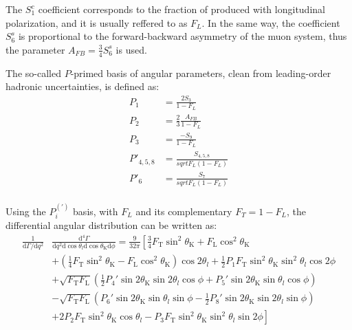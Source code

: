 The $S_1^c$ coefficient corresponds to the fraction of \Ks produced with longitudinal polarization, and it is usually reffered to as $F_L$.
In the same way, the coefficient $S_6^s$ is proportional to the forward-backward asymmetry of the muon system, thus the parameter $A_{FB}=\frac{3}{4}S_6^s$ is used.

The so-called $P$-primed basis of angular parameters, clean from leading-order hadronic uncertainties, is defined as:
\begin{equation}\label{eq:defPPrime}
  \begin{split}
    P_1 &= \frac{2S_3}{1-F_L}\\
    P_2 &= \frac{2}{3}\frac{A_{FB}}{1-F_L}\\
    P_3 &= \frac{-S_9}{1-F_L}\\
    P'_{4,5,8} &= \frac{S_{4,5,8}}{sqrt{F_L(1-F_L)}}\\
    P'_6 &= \frac{S_7}{sqrt{F_L(1-F_L)}}\\
  \end{split}
\end{equation}

Using the $P_i^{(\prime)}$ basis, with $F_L$ and its complementary $F_T=1-F_L$, the differential angular distribution can be written as:
\begin{equation} \label{eq:Angular}
  \begin{split}
    \frac{1}{\mathrm{d}\Gamma/\mathrm{d}q^2}&\frac{\mathrm{d}^4\Gamma}{\mathrm{d}q^2 \mathrm{d}\cos\theta_l \mathrm{d}\cos\theta_\mathrm{K} \mathrm{d}\phi} =\frac{9}{32\pi}\left[\frac{3}{4}F_\mathrm{T}\sin^2\theta_\mathrm{K} + F_\mathrm{L}\cos^2\theta_\mathrm{K} \right.\\
      &\left.+\left(\frac{1}{4}F_\mathrm{T}\sin^2\theta_\mathrm{K}-F_\mathrm{L}\cos^2\theta_\mathrm{K}\right)\cos2\theta_l+\frac{1}{2}P_1F_\mathrm{T}\sin^2\theta_\mathrm{K}\sin^2\theta_l\cos 2\phi \right.\\
      &+\sqrt{F_\mathrm{T}F_\mathrm{L}}\left(\frac{1}{2}P_4'\sin2\theta_\mathrm{K}\sin2\theta_l\cos\phi+P_5'\sin2\theta_\mathrm{K}\sin\theta_l\cos\phi \right)\\
      &-\sqrt{F_\mathrm{T}F_\mathrm{L}}\left(P_6'\sin2\theta_\mathrm{K}\sin\theta_l\sin\phi-\frac{1}{2}P_8'\sin2\theta_\mathrm{K}\sin2\theta_l\sin\phi \right)\\
      &\left.+2P_2F_\mathrm{T}\sin^2\theta_\mathrm{K}\cos\theta_l-P_3F_\mathrm{T}\sin^2\theta_\mathrm{K}\sin^2\theta_l\sin2\phi \right]
  \end{split}
\end{equation}

